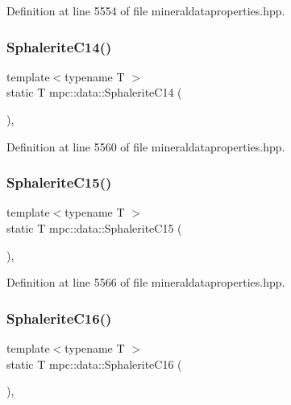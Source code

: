 Definition at line 5554 of file mineraldataproperties.\+hpp.

\mbox{\label{namespacempc_1_1data_aa3e9047ee58a5ac8da124fa64921d5d2}} 
\subsubsection{\texorpdfstring{Sphalerite\+C14()}{SphaleriteC14()}}
{\footnotesize\ttfamily template$<$typename T $>$ \\
static T mpc\+::data\+::\+Sphalerite\+C14 (\begin{DoxyParamCaption}{ }\end{DoxyParamCaption})\hspace{0.3cm}{\ttfamily [inline]}, {\ttfamily [static]}}



Definition at line 5560 of file mineraldataproperties.\+hpp.

\mbox{\label{namespacempc_1_1data_a3f11bacdc71fcfb3f5c8f040aecde0dc}} 
\subsubsection{\texorpdfstring{Sphalerite\+C15()}{SphaleriteC15()}}
{\footnotesize\ttfamily template$<$typename T $>$ \\
static T mpc\+::data\+::\+Sphalerite\+C15 (\begin{DoxyParamCaption}{ }\end{DoxyParamCaption})\hspace{0.3cm}{\ttfamily [inline]}, {\ttfamily [static]}}



Definition at line 5566 of file mineraldataproperties.\+hpp.

\mbox{\label{namespacempc_1_1data_acd828d9844c72354b181e3874ed3978f}} 
\subsubsection{\texorpdfstring{Sphalerite\+C16()}{SphaleriteC16()}}
{\footnotesize\ttfamily template$<$typename T $>$ \\
static T mpc\+::data\+::\+Sphalerite\+C16 (\begin{DoxyParamCaption}{ }\end{DoxyParamCaption})\hspace{0.3cm}{\ttfamily [inline]}, {\ttfamily [static]}}



